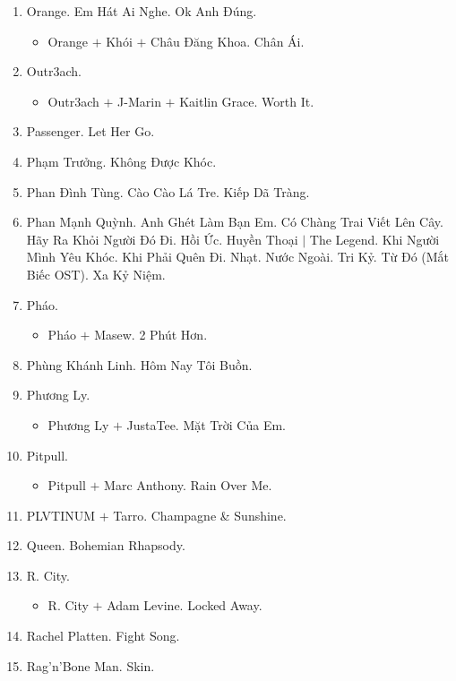 \documentclass{article}
\begin{document}
\begin{enumerate}
	\item {\sc Orange.} Em Hát Ai Nghe. Ok Anh Đúng.
	\begin{itemize}
		\item {\sc Orange $+$ Khói $+$ Châu Đăng Khoa.} Chân Ái.
	\end{itemize}
	\item {\sc Outr3ach.}
	\begin{itemize}
		\item {\sc Outr3ach $+$ J-Marin $+$ Kaitlin Grace.} Worth It.
	\end{itemize}
	\item {\sc Passenger.} Let Her Go.
	\item {\sc Phạm Trưởng.} Không Được Khóc.
	\item {\sc Phan Đình Tùng.} Cào Cào Lá Tre. Kiếp Dã Tràng.
	\item {\sc Phan Mạnh Quỳnh.} Anh Ghét Làm Bạn Em. Có Chàng Trai Viết Lên Cây. Hãy Ra Khỏi Người Đó Đi. Hồi Ức. Huyền Thoại $|$ The Legend. Khi Người Mình Yêu Khóc. Khi Phải Quên Đi. Nhạt. Nước Ngoài. Tri Kỷ. Từ Đó (Mắt Biếc OST). Xa Kỷ Niệm.
	\item {\sc Pháo.}
	\begin{itemize}
		\item {\sc Pháo $+$ Masew.} 2 Phút Hơn.
	\end{itemize}
	\item {\sc Phùng Khánh Linh.} Hôm Nay Tôi Buồn.
	\item {\sc Phương Ly.}
	\begin{itemize}
		\item {\sc Phương Ly $+$ JustaTee.} Mặt Trời Của Em.
	\end{itemize}
	\item {\sc Pitpull.}
	\begin{itemize}
		\item {\sc Pitpull $+$ Marc Anthony.} Rain Over Me.
	\end{itemize}
	\item {\sc PLVTINUM $+$ Tarro.} Champagne \& Sunshine.
	\item {\sc Queen.} Bohemian Rhapsody.
	\item {\sc R. City.}
	\begin{itemize}
		\item {\sc R. City $+$ Adam Levine.} Locked Away.
	\end{itemize}
	\item {\sc Rachel Platten.} Fight Song.
	\item {\sc Rag'n'Bone Man.} Skin.

\end{enumerate}
\end{document}
